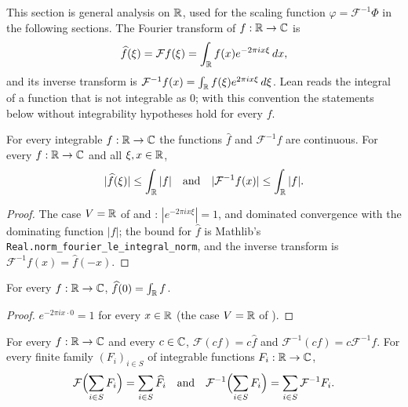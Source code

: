 This section is general analysis on $\mathbb{R}$, used for the scaling function
$\varphi = \mathcal F^{-1} \Phi$ in the following sections. The Fourier transform of
$f : \mathbb{R} \to \mathbb{C}$ is
\[
  \widehat f(\xi) = \mathcal F f(\xi) = \int_{\mathbb{R}} f(x) e^{-2\pi i x \xi} \, dx ,
\]
and its inverse transform is $\mathcal F^{-1} f(x) = \int_{\mathbb{R}} f(\xi) e^{2\pi i x \xi} \, d\xi$.
Lean reads the integral of a function that is not integrable as $0$; with this convention the
statements below without integrability hypotheses hold for every $f$.

\begin{lemma}
\label{lem:daub-fourier-continuous}
\leanok
For every integrable $f : \mathbb{R} \to \mathbb{C}$ the functions $\widehat f$ and $\mathcal F^{-1} f$ are
continuous. For every $f : \mathbb{R} \to \mathbb{C}$ and all $\xi, x \in \mathbb{R}$,
\[
  |\widehat f(\xi)| \leq \int_{\mathbb{R}} |f| \quad\text{and}\quad |\mathcal F^{-1} f(x)| \leq \int_{\mathbb{R}} |f| .
\]
\end{lemma}

\begin{proof}
\leanok
{}
The case $V = \mathbb{R}$ of  and :
$|e^{-2\pi i x \xi}| = 1$, and dominated convergence with the dominating function $|f|$; the
bound for $\widehat f$ is Mathlib's \texttt{Real.norm\_fourier\_le\_integral\_norm}, and the
inverse transform is $\mathcal F^{-1} f(x) = \widehat f(-x)$.
\end{proof}

\begin{lemma}
\label{lem:daub-fourier-zero}
\leanok
For every $f : \mathbb{R} \to \mathbb{C}$, $\widehat f(0) = \int_{\mathbb{R}} f$.
\end{lemma}

\begin{proof}
\leanok
{}
$e^{-2\pi i x \cdot 0} = 1$ for every $x \in \mathbb{R}$ (the case $V = \mathbb{R}$ of ).
\end{proof}

\begin{lemma}[Linearity]
\label{lem:daub-fourier-linear}
\leanok
For every $f : \mathbb{R} \to \mathbb{C}$ and every $c \in \mathbb{C}$, $\mathcal F(c f) = c \widehat f$ and
$\mathcal F^{-1}(c f) = c \mathcal F^{-1} f$. For every finite family $(F_i)_{i \in S}$ of
integrable functions $F_i : \mathbb{R} \to \mathbb{C}$,
\[
  \mathcal F\Bigl(\sum_{i \in S} F_i\Bigr) = \sum_{i \in S} \widehat{F_i}
  \quad\text{and}\quad
  \mathcal F^{-1}\Bigl(\sum_{i \in S} F_i\Bigr) = \sum_{i \in S} \mathcal F^{-1} F_i .
\]
\end{lemma}

